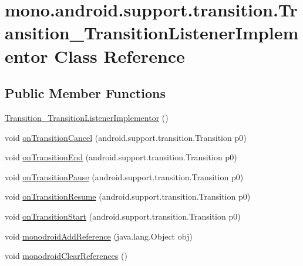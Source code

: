 \hypertarget{classmono_1_1android_1_1support_1_1transition_1_1_transition___transition_listener_implementor}{
\section{mono.android.support.transition.Transition\_\-TransitionListenerImplementor Class Reference}
\label{classmono_1_1android_1_1support_1_1transition_1_1_transition___transition_listener_implementor}
}
\subsection*{Public Member Functions}
\begin{CompactItemize}
\item 
\hyperlink{classmono_1_1android_1_1support_1_1transition_1_1_transition___transition_listener_implementor_d565bbddbf2888ed21a56a2f8a468bad}{Transition\_\-TransitionListenerImplementor} ()
\item 
void \hyperlink{classmono_1_1android_1_1support_1_1transition_1_1_transition___transition_listener_implementor_f65498fb52db97d8d96fd9877b9e9d03}{onTransitionCancel} (android.support.transition.Transition p0)
\item 
void \hyperlink{classmono_1_1android_1_1support_1_1transition_1_1_transition___transition_listener_implementor_44e5a76c400fccf580b95c59372b4971}{onTransitionEnd} (android.support.transition.Transition p0)
\item 
void \hyperlink{classmono_1_1android_1_1support_1_1transition_1_1_transition___transition_listener_implementor_da1584f4505cf3ad91fcc100ea53187b}{onTransitionPause} (android.support.transition.Transition p0)
\item 
void \hyperlink{classmono_1_1android_1_1support_1_1transition_1_1_transition___transition_listener_implementor_77a823014d1bfc2977b5776f001809f4}{onTransitionResume} (android.support.transition.Transition p0)
\item 
void \hyperlink{classmono_1_1android_1_1support_1_1transition_1_1_transition___transition_listener_implementor_84855046a649e6e86df05d5600719013}{onTransitionStart} (android.support.transition.Transition p0)
\item 
void \hyperlink{classmono_1_1android_1_1support_1_1transition_1_1_transition___transition_listener_implementor_2f2d8cf5ec1ff12c13a4a97973c7e599}{monodroidAddReference} (java.lang.Object obj)
\item 
void \hyperlink{classmono_1_1android_1_1support_1_1transition_1_1_transition___transition_listener_implementor_c15396ff7367d32877c580c892c8f247}{monodroidClearReferences} ()
\end{CompactItemize}
